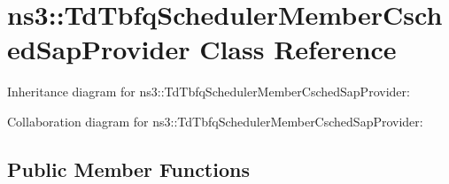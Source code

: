 \hypertarget{classns3_1_1TdTbfqSchedulerMemberCschedSapProvider}{}\section{ns3\+:\+:Td\+Tbfq\+Scheduler\+Member\+Csched\+Sap\+Provider Class Reference}
\label{classns3_1_1TdTbfqSchedulerMemberCschedSapProvider}


Inheritance diagram for ns3\+:\+:Td\+Tbfq\+Scheduler\+Member\+Csched\+Sap\+Provider\+:


Collaboration diagram for ns3\+:\+:Td\+Tbfq\+Scheduler\+Member\+Csched\+Sap\+Provider\+:
\subsection*{Public Member Functions}

